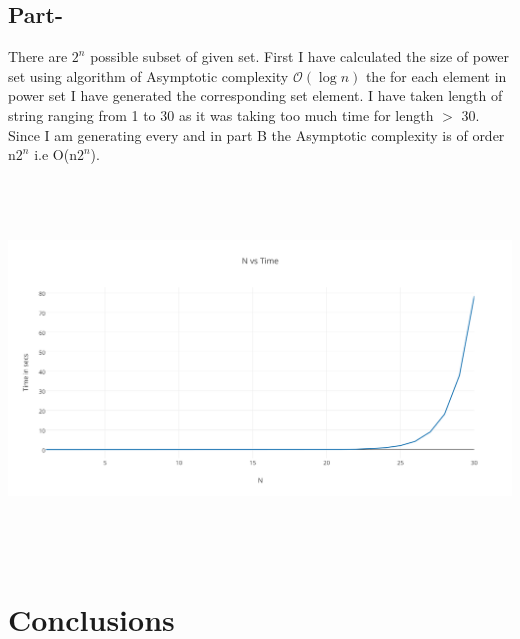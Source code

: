 \documentclass[12pt, a4paper]{article}
\begin{document}
\subsection{Part-}
There are $2^{n}$ possible subset of given set. First I have calculated the size of power set using algorithm of Asymptotic complexity $\mathcal{O}(\log{}n)$  the for each element in power set I have generated the corresponding set element. I have taken length of string ranging from 1 to 30 as it was taking too much time for length $>$ 30. Since I am generating every 
and in part B the Asymptotic complexity is of order n$2^{n}$ i.e O(n$2^{n}$).\\
\begin{center}
 \includegraphics[height = 10cm, width = 16cm]{PartB.png}
\end{center}


\newpage
\section{Conclusions}



%
%
%
\end{document}
